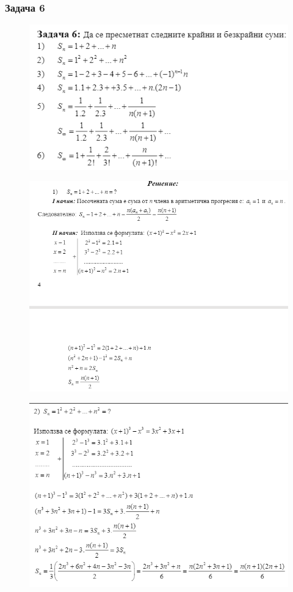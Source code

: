 \documentclass[fleqn, 12pt]{article}
\theoremstyle{definition}
\begin{document}
\subsubsection*{Задача 6}
\begin{figure} [htp!]
\includegraphics[width = \linewidth]{Pics/Discrete math/ex7/ex7-task6-1.png}
\end{figure}
\begin{figure} [htp!]
\includegraphics{Pics/Discrete math/ex7/ex7-task6-2.png}
\end{figure}
\begin{figure} [htp!]
\includegraphics{Pics/Discrete math/ex7/ex7-task6-3.png}
\end{figure}
\end{document}
